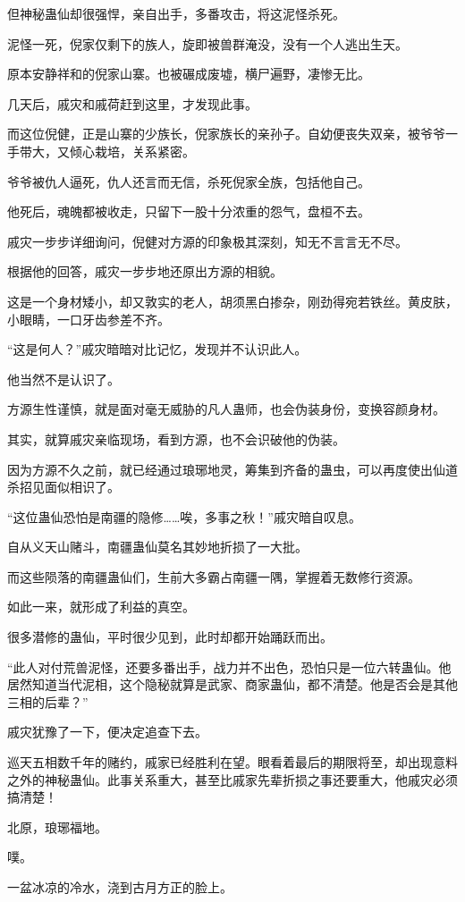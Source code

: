 \begin{this_body}
但神秘蛊仙却很强悍，亲自出手，多番攻击，将这泥怪杀死。

泥怪一死，倪家仅剩下的族人，旋即被兽群淹没，没有一个人逃出生天。

原本安静祥和的倪家山寨。也被碾成废墟，横尸遍野，凄惨无比。

几天后，戚灾和戚荷赶到这里，才发现此事。

而这位倪健，正是山寨的少族长，倪家族长的亲孙子。自幼便丧失双亲，被爷爷一手带大，又倾心栽培，关系紧密。

爷爷被仇人逼死，仇人还言而无信，杀死倪家全族，包括他自己。

他死后，魂魄都被收走，只留下一股十分浓重的怨气，盘桓不去。

戚灾一步步详细询问，倪健对方源的印象极其深刻，知无不言言无不尽。

根据他的回答，戚灾一步步地还原出方源的相貌。

这是一个身材矮小，却又敦实的老人，胡须黑白掺杂，刚劲得宛若铁丝。黄皮肤，小眼睛，一口牙齿参差不齐。

“这是何人？”戚灾暗暗对比记忆，发现并不认识此人。

他当然不是认识了。

方源生性谨慎，就是面对毫无威胁的凡人蛊师，也会伪装身份，变换容颜身材。

其实，就算戚灾亲临现场，看到方源，也不会识破他的伪装。

因为方源不久之前，就已经通过琅琊地灵，筹集到齐备的蛊虫，可以再度使出仙道杀招见面似相识了。

“这位蛊仙恐怕是南疆的隐修……唉，多事之秋！”戚灾暗自叹息。

自从义天山赌斗，南疆蛊仙莫名其妙地折损了一大批。

而这些陨落的南疆蛊仙们，生前大多霸占南疆一隅，掌握着无数修行资源。

如此一来，就形成了利益的真空。

很多潜修的蛊仙，平时很少见到，此时却都开始踊跃而出。

“此人对付荒兽泥怪，还要多番出手，战力并不出色，恐怕只是一位六转蛊仙。他居然知道当代泥相，这个隐秘就算是武家、商家蛊仙，都不清楚。他是否会是其他三相的后辈？”

戚灾犹豫了一下，便决定追查下去。

巡天五相数千年的赌约，戚家已经胜利在望。眼看着最后的期限将至，却出现意料之外的神秘蛊仙。此事关系重大，甚至比戚家先辈折损之事还要重大，他戚灾必须搞清楚！

北原，琅琊福地。

噗。

一盆冰凉的冷水，浇到古月方正的脸上。


\end{this_body}
